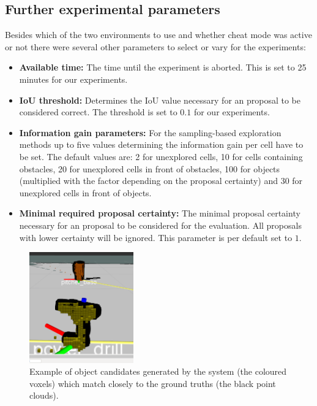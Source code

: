 \documentclass[a4paper,11pt,english]{article}
\begin{document}
\subsection{Further experimental parameters}
Besides which of the two environments to use and whether cheat mode was active or not there were several other parameters to select or vary for the experiments:

\begin{itemize}
	\item \textbf{Available time:} The time until the experiment is aborted. This is set to 25 minutes for our experiments.
	\item \textbf{IoU threshold:} Determines the IoU value necessary for an proposal to be considered correct. The threshold is set to $0.1$ for our experiments.
	\item \textbf{Information gain parameters:} For the sampling-based exploration methods up to five values determining the information gain per cell have to be set. The default values are: 2 for unexplored cells, 10 for cells containing obstacles, 20 for unexplored cells in front of obstacles, 100 for objects (multiplied with the factor depending on the proposal certainty) and 30 for unexplored cells in front of objects.
	\item \textbf{Minimal required proposal certainty:} The minimal proposal certainty necessary for an proposal to be considered for the evaluation. All proposals with lower certainty will be ignored. This parameter is per default set to $1$.
\end{itemize}

\begin{figure}[h]
	\begin{center}
		\includegraphics[width=0.4\textwidth]{src/drill2.png}
		\caption{Example of object candidates generated by the system (the coloured voxels) which match closely to the ground truths (the black point clouds).}
		\label{fig:good_results}
	\end{center}
\end{figure}
\end{document}
